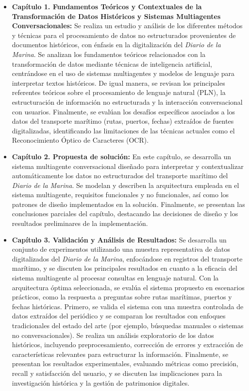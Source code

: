 \begin{itemize}
	\item \textbf{Capítulo 1. Fundamentos Teóricos y Contextuales de la Transformación de Datos Históricos y Sistemas Multiagentes Conversacionales:} Se realiza un estudio y análisis de los diferentes métodos y técnicas para el procesamiento de datos no estructurados provenientes de documentos históricos, con énfasis en la digitalización del \textit{Diario de la Marina}. Se analizan los fundamentos teóricos relacionados con la transformación de datos mediante técnicas de inteligencia artificial, centrándose en el uso de sistemas multiagentes y modelos de lenguaje para interpretar textos históricos. De igual manera, se revisan los principales referentes teóricos sobre el procesamiento de lenguaje natural (PLN), la estructuración de información no estructurada y la interacción conversacional con usuarios. Finalmente, se evalúan los desafíos específicos asociados a los datos del transporte marítimo (rutas, puertos, fechas) extraídos de fuentes digitalizadas, identificando las limitaciones de las técnicas actuales como el Reconocimiento Óptico de Caracteres (OCR).
	
	\item \textbf{Capítulo 2. Propuesta de solución:} En este capítulo, se desarrolla un sistema multiagente conversacional diseñado para interpretar y contextualizar automáticamente los datos no estructurados del transporte marítimo del \textit{Diario de la Marina}. Se modelan y describen la arquitectura empleada en el sistema multiagente, requisitos funcionales y no funcionales, así como los patrones de diseño implementados en la solución. Finalmente, se presentan las conclusiones parciales del capítulo, destacando las decisiones de diseño y los resultados preliminares de la implementación.
	
	\item \textbf{Capítulo 3. Validación y Análisis de Resultados:} Se desarrolla un conjunto de experimentos utilizando una muestra representativa de datos digitalizados del \textit{Diario de la Marina}, enfocándose en registros del transporte marítimo, y se discuten los principales resultados en cuanto a la eficacia del sistema multiagente al procesar consultas en lenguaje natural. Con la arquitectura óptima seleccionada, se evalúa el sistema propuesto en escenarios prácticos, como la respuesta a preguntas sobre rutas marítimas, puertos y fechas históricas. Primero, se valida el sistema con una muestra controlada de datos extraídos del periódico y se comparan los resultados con enfoques tradicionales del estado del arte (por ejemplo, búsquedas manuales o sistemas no conversacionales). Se realiza un análisis exploratorio de los datos históricos, incluyendo preprocesamiento, corrección de errores y extracción de características relevantes para estructurar la información. Finalmente, se presentan los resultados experimentales, evaluando métricas como precisión, recall y satisfacción del usuario, y se discuten las implicaciones para la investigación histórica y la gestión de patrimonios digitales.
\end{itemize}


	












